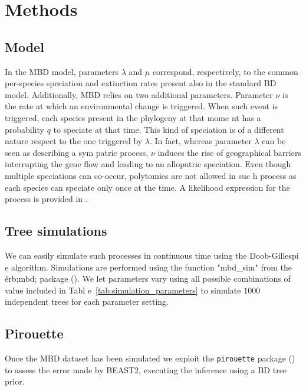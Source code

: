 \section{Methods}

\subsection{Model}

In the MBD model, parameters $\lambda$ and $\mu$ correspond, respectively, 
to the common per-species speciation and extinction rates present 
also in the standard BD model. 
Additionally, MBD relies on two additional parameters. 
Parameter $\nu$ is the rate at which an environmental change is triggered.
When such event is triggered, each species present in the phylogeny at that mome
nt has a probability $q$ to speciate at that time.
This kind of speciation is of a different nature respect to the one triggered by
 $\lambda$. In fact, whereas parameter $\lambda$ can be seen as describing a sym
patric process, $\nu$ induces the rise of geographical barriers interrupting the
 gene flow and leading to an allopatric speciation.
Even though multiple speciations can co-occur, polytomies are not allowed in suc
h process as each species can speciate only once at the time.
A likelihood expression for the process is provided in \cite{mbd}.

\subsection{Tree simulations}

We can easily simulate such processes in continuous time using the Doob-Gillespi
e algorithm. Simulations are performed using the function "mbd\_sim" from the \v
erb;mbd; package (\citep{mbd}).
We let parameters vary using all possible combinations of value included in Tabl
e~\ref{tab:simulation_parameters} to simulate $1000$ independent trees for each 
parameter setting.



\subsection{Pirouette}

Once the MBD dataset has been simulated we exploit the \verb;pirouette; package 
(\citep{pirouette}) to assess the error made by BEAST2, executing  the inference
 using a BD tree prior.

